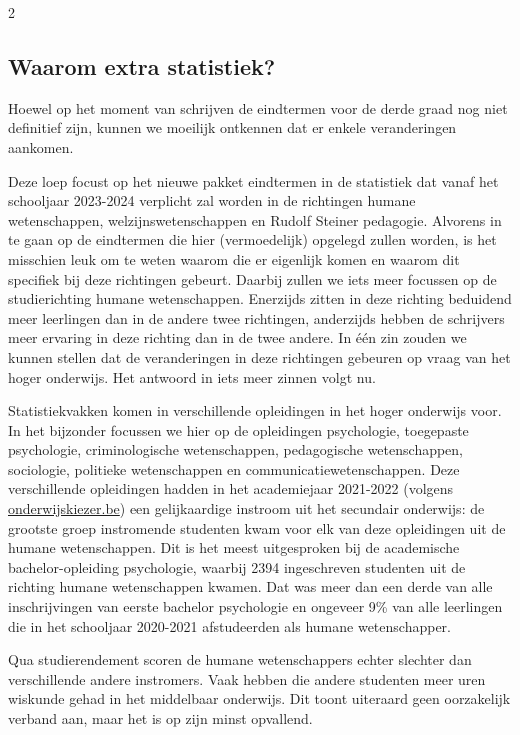\begin{multicols}{2}
	\subsection*{Waarom extra statistiek?}
        Hoewel op het moment van schrijven de eindtermen voor de derde graad nog niet definitief zijn, kunnen we moeilijk ontkennen dat er enkele veranderingen aankomen. 
        
        Deze loep focust op het nieuwe pakket eindtermen in de statistiek dat vanaf het schooljaar 2023-2024 verplicht zal worden in de richtingen humane wetenschappen, welzijnswetenschappen en Rudolf Steiner pedagogie. Alvorens in te gaan op de eindtermen die hier (vermoedelijk) opgelegd zullen worden, is het misschien leuk om te weten waarom die er eigenlijk komen en waarom dit specifiek bij deze richtingen gebeurt. Daarbij zullen we iets meer focussen op de studierichting humane wetenschappen. Enerzijds zitten in deze richting beduidend meer leerlingen dan in de andere twee richtingen, anderzijds hebben de schrijvers meer ervaring in deze richting dan in de twee andere. In één zin zouden we kunnen stellen dat de veranderingen in deze richtingen gebeuren op vraag van het hoger onderwijs. Het antwoord in iets meer zinnen volgt nu. 
        
      
        Statistiekvakken komen in verschillende opleidingen in het hoger onderwijs voor. In het bijzonder focussen we hier op de opleidingen psychologie, toegepaste psychologie, criminologische wetenschappen, pedagogische wetenschappen, sociologie, politieke wetenschappen en communicatiewetenschappen. Deze verschillende opleidingen hadden in het academiejaar 2021-2022 (volgens \url{onderwijskiezer.be}) een gelijkaardige instroom uit het secundair onderwijs: de grootste groep instromende studenten kwam voor elk van deze opleidingen uit de humane wetenschappen. Dit is het meest uitgesproken bij de academische bachelor-opleiding psychologie, waarbij 2394 ingeschreven studenten uit de richting humane wetenschappen kwamen. Dat was meer dan een derde van alle inschrijvingen van eerste bachelor psychologie en ongeveer 9\% van alle leerlingen die in het schooljaar 2020-2021 afstudeerden als humane wetenschapper. 
        
        Qua studierendement scoren de humane wetenschappers echter slechter dan verschillende andere instromers. Vaak hebben die andere studenten meer uren wiskunde gehad in het middelbaar onderwijs. Dit toont uiteraard geen oorzakelijk verband aan, maar het is op zijn minst opvallend.


\end{multicols}
